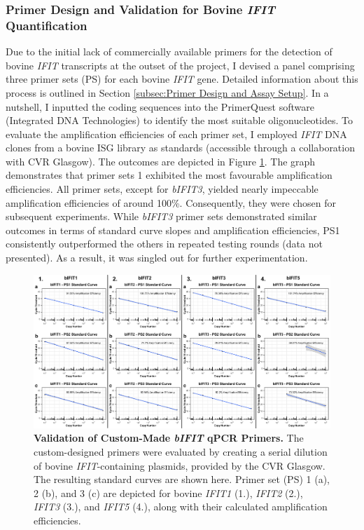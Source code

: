\subsubsection{Primer Design and Validation for Bovine \textit{IFIT} Quantification} \label{Primer Design and Validation for Bovine IFIT Quantification}
Due to the initial lack of commercially available primers for the detection of bovine \textit{IFIT} transcripts at the outset of the project, I devised a panel comprising three primer sets (PS) for each bovine \textit{IFIT} gene. Detailed information about this process is outlined in Section \ref{subsec:Primer Design and Assay Setup}. In a nutshell, I inputted the coding sequences into the PrimerQuest software (Integrated DNA Technologies) to identify the most suitable oligonucleotides. To evaluate the amplification efficiencies of each primer set, I employed \textit{IFIT} DNA clones from a bovine ISG library as standards (accessible through a collaboration with CVR Glasgow). The outcomes are depicted in Figure \ref{fig:Validation of custom-made bIFIT qPCR primers}. The graph demonstrates that primer sets 1 exhibited the most favourable amplification efficiencies. All primer sets, except for \textit{bIFIT3}, yielded nearly impeccable amplification efficiencies of around 100\%. Consequently, they were chosen for subsequent experiments. While \textit{bIFIT3} primer sets demonstrated similar outcomes in terms of standard curve slopes and amplification efficiencies, PS1 consistently outperformed the others in repeated testing rounds (data not presented). As a result, it was singled out for further experimentation.

\begin{figure}
    \centering
    \includegraphics[width=1\linewidth]{07. Chapter 2/Figs/01. Technologies/02. primer validation.pdf}
    \caption[Validation of Custom-Made \textit{bIFIT} qPCR Primers.]{\textbf{Validation of Custom-Made \textit{bIFIT} qPCR Primers.} The custom-designed primers were evaluated by creating a serial dilution of bovine \textit{IFIT}-containing plasmids, provided by the CVR Glasgow. The resulting standard curves are shown here. Primer set (PS) 1 (a), 2 (b), and 3 (c) are depicted for bovine \textit{IFIT1} (1.), \textit{IFIT2} (2.), \textit{IFIT3} (3.), and \textit{IFIT5} (4.), along with their calculated amplification efficiencies.}
    \label{fig:Validation of custom-made bIFIT qPCR primers}
\end{figure}

